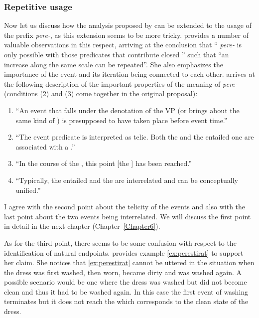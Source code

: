 \subsubsection{Repetitive usage}
Now let us discuss how the analysis proposed by \citet{Kagan:book} can be extended to the  usage of the prefix \textit{pere-}, as this extension seems to be more tricky. \citet[149]{Kagan:book} provides a number of valuable observations in this respect, arriving at the conclusion that `` \textit{pere-} is only possible with those predicates that contribute closed ''
such that ``an increase along the same scale can be repeated''. She also emphasizes the importance of the event and its iteration being connected to each other. \citet[148]{Kagan:book} arrives at the following description of the important properties of the  meaning of \textit{pere-} (conditions (2) and (3) come together in the original proposal): 
\begin{enumerate}
\item ``An event that falls under the denotation of the VP (or brings about the same kind of ) is presupposed to have taken place before event time.'' 
\item ``The event predicate is interpreted as telic. Both the  and the entailed one are associated with a .'' 
\item ``In the course of the , this point [the ] has been reached.''
\item ``Typically, the entailed and the  are interrelated and can be conceptually unified.''
\end{enumerate}

I agree with the second point about the telicity of the events and also with the last point about the two events being interrelated. We will discuss the first point in detail in the next chapter (Chapter~\ref{Chapter6}). 

As for the third point, there seems to be some confusion with respect to the identification of natural endpoints. \citet{Kagan:book} provides example \ref{ex:perestirat} to support her claim. She notices that \ref{ex:perestirat} cannot be uttered in the situation when the dress was first washed, then worn, became dirty and was washed again. A possible scenario would be one where the dress was washed but did not become clean and thus it had to be washed again. In this case the first event of washing terminates but it does not reach the  which corresponds to the clean state of the dress.

